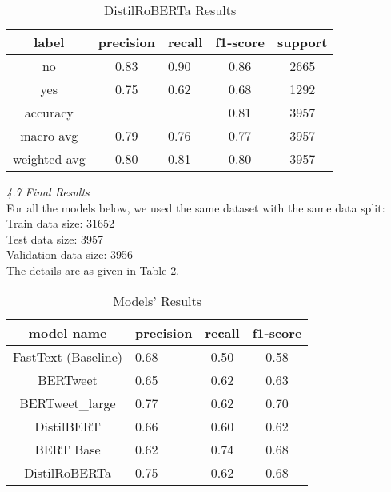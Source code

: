 \documentclass[a4paper, 10pt, conference]{IEEEtran}
\begin{document}
{{{\begin{table}[h!]
\centering
  \caption{DistilRoBERTa Results}
  \label{tab5}
  \setlength{\tabcolsep}{6pt} %
  \renewcommand{\arraystretch}{1.2}%
    \begin{tabular}{c c l c c}
 \hline
    label & precision & recall & f1-score & support \\
    \hline
    no  & 0.83  &  0.90 &  0.86 & 2665 \\ %
    yes  & 0.75  &  0.62 &  0.68 & 1292 \\ %
    accuracy   &      &        &  0.81 & 3957 \\ %
    macro avg & 0.79 & 0.76 & 0.77 & 3957 \\ %
    weighted avg & 0.80 & 0.81 & 0.80 & 3957 \\ \hline
  \end{tabular}
\end{table}


\noindent\textit{4.7 Final Results}\\

For all the models below, we used the same dataset with the same data split:\\
Train data size: 31652\\
Test data size: 3957\\
Validation data size: 3956\\

The details are as given in Table \ref{tab6}. 

\begin{table}[h!]
\centering
  \caption{Models' Results}
  \label{tab6}
  \setlength{\tabcolsep}{6pt} %
  \renewcommand{\arraystretch}{1.2}%
    \begin{tabular}{c l c c}
 \hline
    model name & precision & recall & f1-score\\
    \hline
    FastText (Baseline)  & 0.68  &  0.50 &  0.58 \\ %
    BERTweet  & 0.65  &  0.62 &  0.63  \\ %
    BERTweet\_large   &  0.77  &  0.62 &  0.70 \\ %
    DistilBERT & 0.66  &  0.60 &  0.62 \\ %
    BERT Base & 0.62  &  0.74 &  0.68 \\ %
    DistilRoBERTa & 0.75 & 0.62 & 0.68 \\ \hline
  \end{tabular}
\end{table}

}}}
\end{document}
